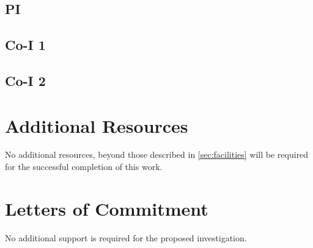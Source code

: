 \documentclass[oneside,12pt]{article}
\begin{document}
    \subsection{PI}

    \subsection{Co-I 1}
    \subsection{Co-I 2}


    \section{Additional Resources}

    No additional resources, beyond those described in \cref{sec:facilities} will be required for the successful completion of this work.


    \section{Letters of Commitment}

    No additional support is  required for the proposed investigation.
\end{document}
